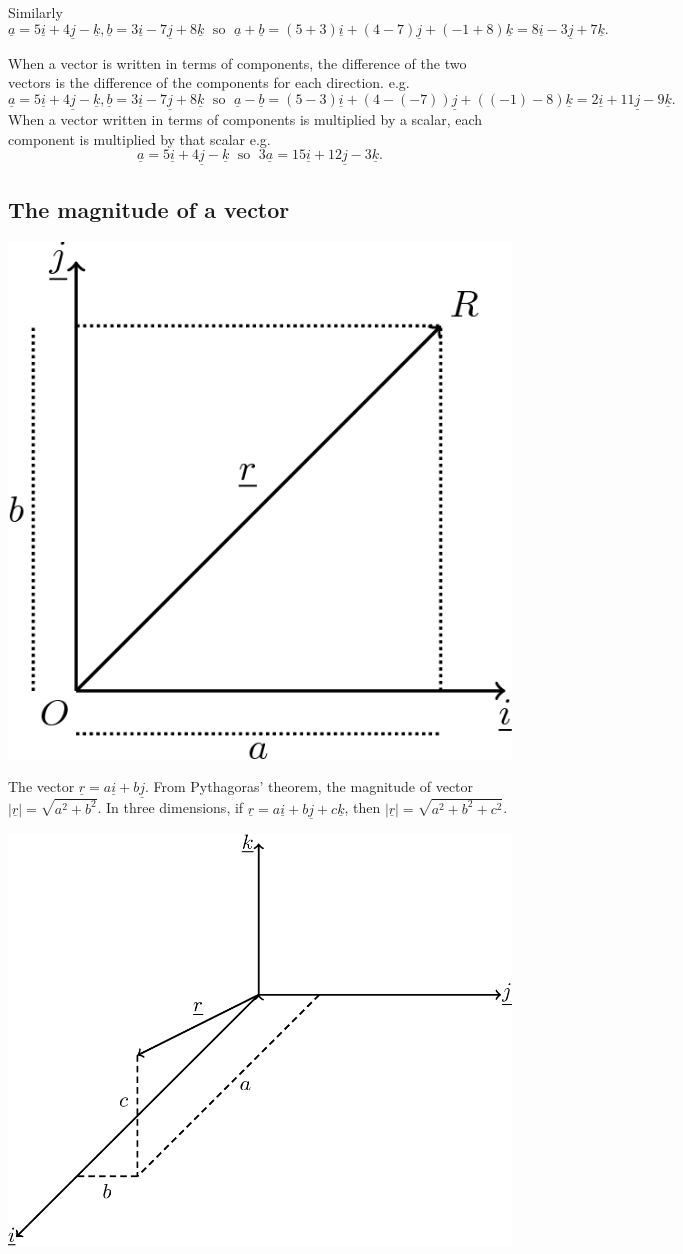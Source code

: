 \documentclass[
  11pt,
  oneside]{book}
\newcommand{\slide}{}
\theoremstyle{definition}
\theoremstyle{definition}
\theoremstyle{definition}
\theoremstyle{definition}
\theoremstyle{remark}
\begin{document}
Similarly
\[
\underline a = 5\underline i + 4\underline j - \underline k, \underline b = 3\underline i - 7\underline j + 8\underline k\;\text{ so }\; \underline a + \underline b = (5+3)\underline i + (4 - 7)\underline j + (-1 + 8)\underline k = 8\underline i -3\underline j + 7\underline k.
\]

When a vector is written in terms of components, the difference of the two vectors is the difference of the components for each direction. e.g.
\[
\underline a = 5\underline i + 4\underline j - \underline k, \underline b = 3\underline i - 7\underline j + 8\underline k\;\text{ so }\; \underline a - \underline b = (5 - 3)\underline i + (4 - (-7))\underline j + ((-1) - 8)\underline k = 2\underline i + 11\underline j -9\underline k.
\]
When a vector written in terms of components is multiplied by a scalar, each component is multiplied by that scalar e.g.
\[
\underline a = 5\underline i + 4\underline j - \underline k\;\text{ so }\;3\underline a = 15\underline i + 12\underline j - 3\underline k.
\]
\slide

\subsection{The magnitude of a vector}\label{the-magnitude-of-a-vector}

\begin{center}\includegraphics[width=0.25\linewidth]{tikztopng-figure60} \end{center}

The vector \(\underline r = a\underline i + b\underline j\). From Pythagoras' theorem, the magnitude of vector \(|\underline r| = \sqrt{a^2+b^2}\). In three dimensions, if \(\underline r = a\underline i + b\underline j + c\underline k\), then \(|\underline r| = \sqrt{a^2+b^2+c^2}\).

\begin{center}\includegraphics[width=0.35\linewidth]{tikztopng-figure59} \end{center}
\end{document}

